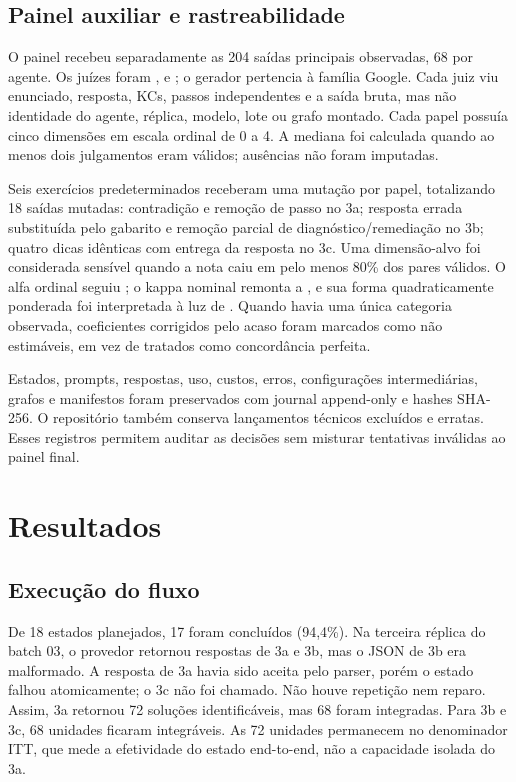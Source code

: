 \documentclass[11pt,a4paper]{article}
\newcommand{\ITT}{ITT}
\begin{document}
\subsection{Painel auxiliar e rastreabilidade}

O painel recebeu separadamente as 204 saídas principais observadas, 68 por agente. Os juízes foram ,  e ; o gerador pertencia à família Google. Cada juiz viu enunciado, resposta, KCs, passos independentes e a saída bruta, mas não identidade do agente, réplica, modelo, lote ou grafo montado. Cada papel possuía cinco dimensões em escala ordinal de 0 a 4. A mediana foi calculada quando ao menos dois julgamentos eram válidos; ausências não foram imputadas.

Seis exercícios predeterminados receberam uma mutação por papel, totalizando 18 saídas mutadas: contradição e remoção de passo no 3a; resposta errada substituída pelo gabarito e remoção parcial de diagnóstico/remediação no 3b; quatro dicas idênticas com entrega da resposta no 3c. Uma dimensão-alvo foi considerada sensível quando a nota caiu em pelo menos 80\% dos pares válidos. O alfa ordinal seguiu \citet{krippendorff2018}; o kappa nominal remonta a \citet{cohen1960}, e sua forma quadraticamente ponderada foi interpretada à luz de \citet{fleiss1973}. Quando havia uma única categoria observada, coeficientes corrigidos pelo acaso foram marcados como não estimáveis, em vez de tratados como concordância perfeita.

Estados, prompts, respostas, uso, custos, erros, configurações intermediárias, grafos e manifestos foram preservados com journal append-only e hashes SHA-256. O repositório também conserva lançamentos técnicos excluídos e erratas. Esses registros permitem auditar as decisões sem misturar tentativas inválidas ao painel final.

\section{Resultados}

\subsection{Execução do fluxo}

De 18 estados planejados, 17 foram concluídos (94,4\%). Na terceira réplica do batch 03, o provedor retornou respostas de 3a e 3b, mas o JSON de 3b era malformado. A resposta de 3a havia sido aceita pelo parser, porém o estado falhou atomicamente; o 3c não foi chamado. Não houve repetição nem reparo. Assim, 3a retornou 72 soluções identificáveis, mas 68 foram integradas. Para 3b e 3c, 68 unidades ficaram integráveis. As 72 unidades permanecem no denominador \ITT{}, que mede a efetividade do estado end-to-end, não a capacidade isolada do 3a.
\end{document}

